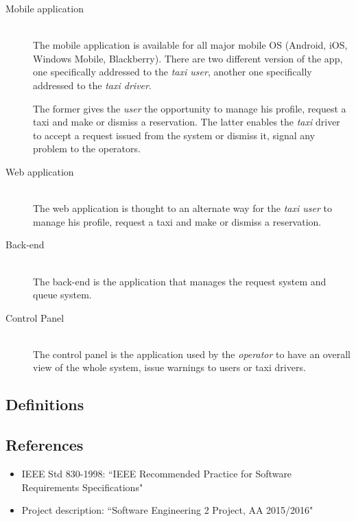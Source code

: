 \documentclass[12pt, a4paper]{article}
\begin{document}
\begin{description}
  \item[Mobile application] \hfill \\
  The mobile application is available for all major mobile OS (Android, iOS, Windows Mobile, Blackberry).
  There are two different version of the app, one specifically addressed to the \emph{taxi user}, another one specifically addressed to the \emph{taxi driver}.

  The former gives the \emph{user} the opportunity to manage his profile, request a taxi and make or dismiss a reservation.
  The latter enables the \emph{taxi} driver to accept a request issued from the system or dismiss it, signal any problem to the operators.

  \item[Web application] \hfill \\
  The web application is thought to an alternate way for the \emph{taxi user} to manage his profile, request a taxi and make or dismiss a reservation.

  \item[Back-end] \hfill \\
  The back-end is the application that manages the request system and queue system.

  \item[Control Panel] \hfill \\
  The control panel is the application used by the \emph{operator} to have an overall view of the whole system, issue warnings to users or taxi drivers.
\end{description}


\subsection{Definitions}

\subsection{References}
\begin{itemize}
\item IEEE Std 830-1998: ``IEEE Recommended Practice for Software Requirements Specifications"
\item Project description: ``Software Engineering 2 Project, AA 2015/2016"
\end{itemize}
\end{document}
